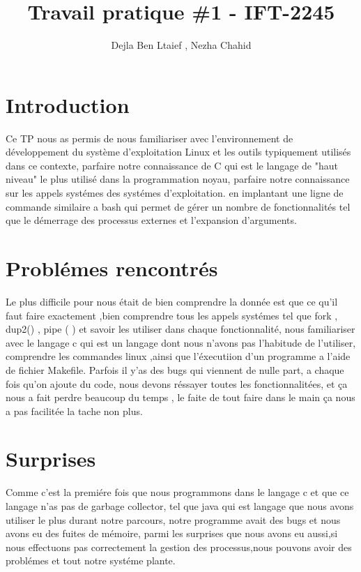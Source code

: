 \documentclass{article}
\title{Travail pratique \#1 - IFT-2245}
\author{Dejla Ben Ltaief , Nezha Chahid}
\begin{document}
\maketitle


\section{Introduction}
Ce TP  nous as permis de nous familiariser avec l'environnement de développement du système d'exploitation Linux et les outils typiquement utilisés dans ce contexte, parfaire notre connaissance de C qui est le langage de "haut niveau" le plus utilisé dans la programmation noyau, parfaire notre connaissance sur  les appels systémes des systémes d'exploitation. en implantant une ligne de commande similaire a bash qui permet de gérer un nombre de fonctionnalités tel que le démerrage des processus externes et l'expansion d'arguments.

\section{Problémes rencontrés}

Le plus difficile pour nous était de bien comprendre la donnée est que ce qu'il faut faire exactement ,bien comprendre tous les appels  systémes tel que  fork , dup2() , pipe ( ) et savoir les utiliser dans chaque fonctionnalité, nous familiariser avec le langage c qui est un langage dont nous n'avons pas l'habitude de l'utiliser, comprendre les commandes linux ,ainsi que l'éxecutiion d'un programme a l'aide de fichier Makefile.
\newline Parfois il y'as des bugs qui viennent de nulle part, a chaque fois qu'on ajoute du code, nous devons réssayer toutes les fonctionnalitées, et \c{c}a nous a fait perdre beaucoup du temps , le faite de tout faire dans le main  \c{c}a nous a pas facilitée la tache non plus.
\section{Surprises}
Comme c'est la premiére fois que nous programmons dans le langage c et que ce langage n'as pas de garbage collector, tel que java qui est langage que nous avons utiliser le plus durant notre parcours, notre programme avait des bugs et nous avons eu des fuites de mémoire, parmi les surprises que nous avons eu aussi,si nous effectuons pas correctement la gestion des processus,nous pouvons avoir des problémes et tout notre systéme plante.
\end{document}
